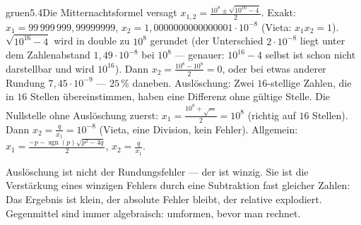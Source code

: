 \begin{loesungkarte}{gruen}{5.4}{Die Mitternachtsformel versagt}
$x_{1,2} = \frac{10^{8}\pm\sqrt{10^{16} - 4}}2$. Exakt: $x_1 = 99\,999\,999{,}99999999$, $x_2 = 1{,}0000000000000001\cdot10^{-8}$ (Vieta: $x_1x_2 = 1$).
$\sqrt{10^{16} - 4}$ wird in double zu $10^{8}$ gerundet (der Unterschied $2\cdot10^{-8}$ liegt unter dem Zahlenabstand $1{,}49\cdot10^{-8}$ bei $10^{8}$ --- genauer: $10^{16} - 4$ selbst ist schon nicht darstellbar und wird $10^{16}$). Dann $x_2 = \frac{10^{8} - 10^{8}}2 = 0$, oder bei etwas anderer Rundung $7{,}45\cdot10^{-9}$ --- $25\,\%$ daneben. Auslöschung: Zwei $16$-stellige Zahlen, die in $16$ Stellen übereinstimmen, haben eine Differenz ohne gültige Stelle.
Die Nullstelle ohne Auslöschung zuerst: $x_1 = \frac{10^{8} + \sqrt{\dots}}2 = 10^{8}$ (richtig auf $16$ Stellen). Dann $x_2 = \frac q{x_1} = 10^{-8}$ (Vieta, eine Division, kein Fehler). Allgemein: $x_1 = \frac{-p - \operatorname{sgn}(p)\sqrt{p^{2} - 4q}}2$, $x_2 = \frac q{x_1}$.
\begin{mitnehmen}\kastentext
Auslöschung ist nicht der Rundungsfehler --- der ist winzig. Sie ist die Verstärkung eines winzigen Fehlers durch eine Subtraktion fast gleicher Zahlen: Das Ergebnis ist klein, der absolute Fehler bleibt, der relative explodiert. Gegenmittel sind immer algebraisch: umformen, bevor man rechnet.
\end{mitnehmen}
\end{loesungkarte}

